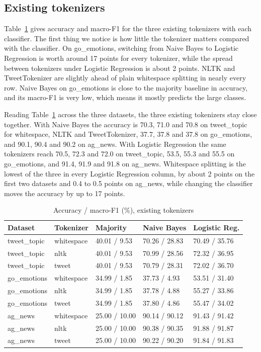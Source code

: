\documentclass[journal,a4paper]{IEEEtran}
\begin{document}
\subsection{Existing tokenizers}\label{sec:4.2}
Table~\ref{tab:2} gives accuracy and macro-F1 for the three existing tokenizers with each classifier. The first thing we notice is how little the tokenizer matters compared with the classifier. On go\_emotions, switching from Naive Bayes to Logistic Regression is worth around 17 points for every tokenizer, while the spread between tokenizers under Logistic Regression is about 2 points. NLTK and TweetTokenizer are slightly ahead of plain whitespace splitting in nearly every row. Naive Bayes on go\_emotions is close to the majority baseline in accuracy, and its macro-F1 is very low, which means it mostly predicts the large classes.

Reading Table~\ref{tab:2} across the three datasets, the three existing tokenizers stay close together. With Naive Bayes the accuracy is 70.3, 71.0 and 70.8 on tweet\_topic for whitespace, NLTK and TweetTokenizer, 37.7, 37.8 and 37.8 on go\_emotions, and 90.1, 90.4 and 90.2 on ag\_news. With Logistic Regression the same tokenizers reach 70.5, 72.3 and 72.0 on tweet\_topic, 53.5, 55.3 and 55.5 on go\_emotions, and 91.4, 91.9 and 91.8 on ag\_news. Whitespace splitting is the lowest of the three in every Logistic Regression column, by about 2 points on the first two datasets and 0.4 to 0.5 points on ag\_news, while changing the classifier moves the accuracy by up to 17 points.

\begin{table}[!tb]
\caption{Accuracy / macro-F1 (\%), existing tokenizers}\label{tab:2}
\centering
\scriptsize
\setlength{\tabcolsep}{3pt}
\begin{tabular}{lllll}
\toprule
\textbf{Dataset} & \textbf{Tokenizer} & \textbf{Majority} & \textbf{Naive Bayes} & \textbf{Logistic Reg.} \\
\midrule
tweet\_topic & whitespace & 40.01 / 9.53 & 70.26 / 28.83 & 70.49 / 35.76 \\
tweet\_topic & nltk & 40.01 / 9.53 & 70.99 / 28.56 & 72.32 / 36.95 \\
tweet\_topic & tweet & 40.01 / 9.53 & 70.79 / 28.31 & 72.02 / 36.70 \\
go\_emotions & whitespace & 34.99 / 1.85 & 37.73 / 4.93 & 53.51 / 31.40 \\
go\_emotions & nltk & 34.99 / 1.85 & 37.78 / 4.88 & 55.27 / 33.86 \\
go\_emotions & tweet & 34.99 / 1.85 & 37.80 / 4.86 & 55.47 / 34.02 \\
ag\_news & whitespace & 25.00 / 10.00 & 90.14 / 90.12 & 91.43 / 91.42 \\
ag\_news & nltk & 25.00 / 10.00 & 90.38 / 90.35 & 91.88 / 91.87 \\
ag\_news & tweet & 25.00 / 10.00 & 90.22 / 90.20 & 91.84 / 91.83 \\
\bottomrule
\end{tabular}
\end{table}
\end{document}
